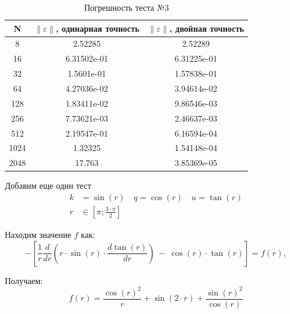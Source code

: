   \begin{table}[H]
    \centering
    \begin{tabular}{c | c | c}
      \toprule
      N & $ \left\lVert \varepsilon \right\rVert  $, одинарная точность & $ \left\lVert \varepsilon \right\rVert  $, двойная точность \\
      \midrule
      8 & 2.52285 & 2.52289\\
      16 & 6.31502e-01 & 6.31225e-01\\
      32 & 1.5601e-01 & 1.57838e-01\\
      64 & 4.27036e-02 & 3.94614e-02\\
      128 & 1.83411e-02 & 9.86546e-03\\
      256 & 7.73621e-03 & 2.46637e-03\\
      512 & 2.19547e-01 & 6.16594e-04\\
      1024 & 1.32325 & 1.54148e-04\\
      2048 & 17.763 & 3.85369e-05\\
      \bottomrule
    \end{tabular}
    \caption{Погрешность теста №3}
  \end{table}

  Добавим еще один тест
  \begin{align*}
    k &= \sin(r) \quad q = \cos(r) \quad u = \tan(r) \\
    r &\in [\pi; \frac{3 \cdot \pi}{2} ]
  \end{align*}

  Находим значение $f$ как:
  \[
    -\left[ \frac{1}{r} \frac{d}{dr} \left(r \cdot \sin(r) \cdot \frac{d \tan(r)}{dr} \right)\ -\ \cos(r) \cdot \tan(r) \right] = f(r),
  \]

  Получаем:
  \[
    f(r) = \frac{\cos(r)^2}{r} + \sin(2 \cdot r) + \frac{\sin(r)^2}{\cos(r)}
  \]

